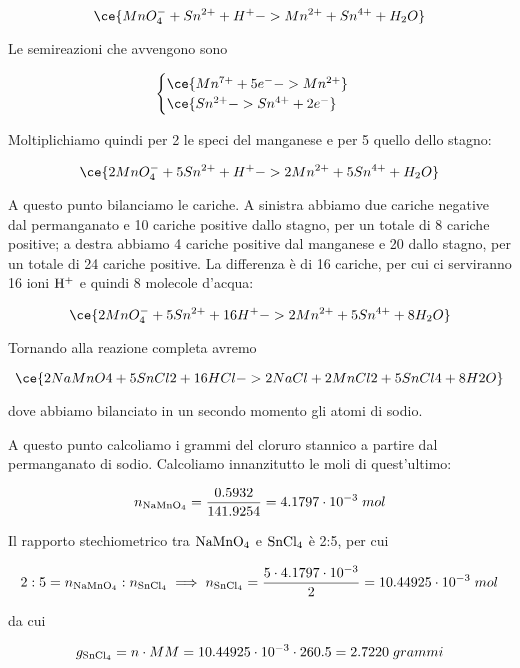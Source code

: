 $$\ce{MnO_4^- + Sn^{2+} + H^+ -> Mn^{2+} + Sn^{4+} + H_2O}$$

Le semireazioni che avvengono sono

$$\begin{cases}
    \ce{Mn^{7+} + 5e^- -> Mn^{2+}}\\
    \ce{Sn^{2+} -> Sn^{4+} + 2e^-}
\end{cases}$$

Moltiplichiamo quindi per 2 le speci del manganese e per 5 quello dello stagno:

$$\ce{2MnO_4^- + 5Sn^{2+} + H^+ -> 2Mn^{2+} + 5Sn^{4+} + H_2O}$$

A questo punto bilanciamo le cariche. A sinistra abbiamo due cariche negative dal permanganato e 10 cariche positive dallo stagno, per un totale di 8 cariche positive; a destra abbiamo 4 cariche positive dal manganese e 20 dallo stagno, per un totale di 24 cariche positive. La differenza è di 16 cariche, per cui ci serviranno 16 ioni $\rm H^+$ e quindi 8 molecole d'acqua: 

$$\ce{2MnO_4^- + 5Sn^{2+} + 16H^+ -> 2Mn^{2+} + 5Sn^{4+} + 8H_2O}$$

Tornando alla reazione completa avremo

$$\ce{2NaMnO4 + 5SnCl2 + 16HCl -> 2NaCl + 2MnCl2 + 5SnCl4 + 8H2O}$$

dove abbiamo bilanciato in un secondo momento gli atomi di sodio.

A questo punto calcoliamo i grammi del cloruro stannico a partire dal permanganato di sodio. Calcoliamo innanzitutto le moli di quest'ultimo:

$$n_{\rm NaMnO_4}=\frac{0.5932}{141.9254}
=4.1797 \cdot 10^{-3}\;mol$$

Il rapporto stechiometrico tra $\rm NaMnO_4$ e $\rm SnCl_4$ è 2:5, per cui 

$$2:5=n_{\rm NaMnO_4}:n_{\rm SnCl_4}
\implies
n_{\rm SnCl_4}=\frac{5 \cdot 4.1797 \cdot 10^{-3}}{2}
=10.44925 \cdot 10^{-3}\;mol$$

da cui

$$g_{\rm SnCl_4}=n \cdot MM=10.44925 \cdot 10^{-3} \cdot 260.5=2.7220\;grammi$$
